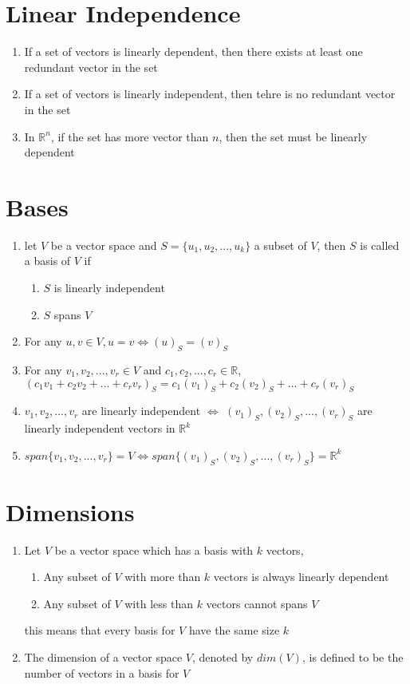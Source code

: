 \documentclass{article}
\begin{document}
\section*{Linear Independence}
\begin{enumerate}
\item If a set of vectors is linearly dependent, then there exists at least one redundant vector in the set
\item If a set of vectors is linearly independent, then tehre is no redundant vector in the set
\item In $\mathbb{R}^n$, if the set has more vector than $n$, then the set must be linearly dependent
\end{enumerate}

\section*{Bases}
\begin{enumerate}
\item let $V$ be a vector space and $S = \{ u_1, u_2, ..., u_k \}$ a subset of $V$, then $S$ is called a basis of $V$ if 
\begin{enumerate}
    \item $S$ is linearly independent
    \item $S$ spans $V$
\end{enumerate}
\item For any $u, v \in V, u = v \Leftrightarrow (u)_S = (v)_S$
\item For any $v_1, v_2, ..., v_r \in V$ and $c_1, c_2, ..., c_r \in \mathbb{R}$,\\$(c_1v_1 + c_2v_2 + ... + c_rv_r)_S = c_1(v_1)_S + c_2(v_2)_S + ... + c_r(v_r)_S$
\item $ v_1, v_2, ..., v_r $ are linearly independent $\Leftrightarrow
$ $ (v_1)_S, (v_2)_S, ..., (v_r)_S $ are linearly independent vectors in $ \mathbb{R}^k $ 
\item $span\{v_1, v_2, ..., v_r\} = V \Leftrightarrow span\{(v_1)_S, (v_2)_S, ..., (v_r)_S\} = \mathbb{R}^k$
\end{enumerate}

\section*{Dimensions}
\begin{enumerate}
\item Let $V$ be a vector space which has a basis with $k$ vectors,
\begin{enumerate}
    \item Any subset of $V$ with more than $k$ vectors is always linearly dependent
    \item Any subset of $V$ with less than $k$ vectors cannot spans $V$
\end{enumerate} this means that every basis for $V$ have the same size $k$
\item The dimension of a vector space $V$, denoted by $dim(V)$, is defined to be the number of vectors in a basis for $V$
\end{enumerate}
\end{document}
